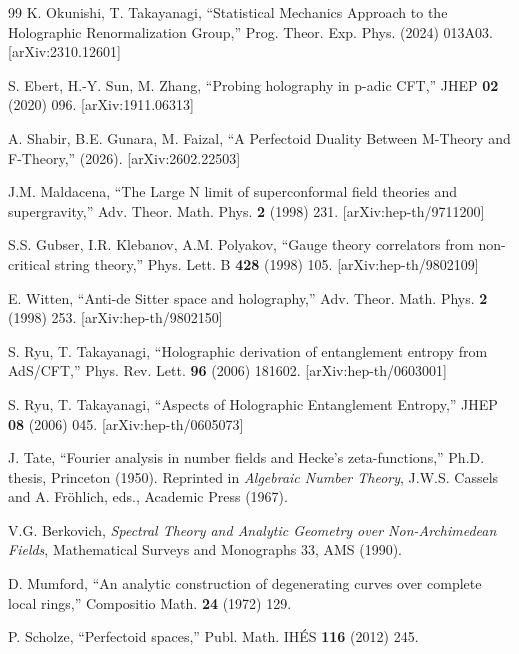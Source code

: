 \documentclass[11pt,a4paper]{ctexart}
\theoremstyle{remark}
\begin{document}
\begin{thebibliography}{99}
 K. Okunishi, T. Takayanagi, ``Statistical Mechanics Approach to the Holographic Renormalization Group,'' Prog. Theor. Exp. Phys. (2024) 013A03. [arXiv:2310.12601]

 S. Ebert, H.-Y. Sun, M. Zhang, ``Probing holography in p-adic CFT,'' JHEP \textbf{02} (2020) 096. [arXiv:1911.06313]

 A. Shabir, B.E. Gunara, M. Faizal, ``A Perfectoid Duality Between M-Theory and F-Theory,'' (2026). [arXiv:2602.22503]


 J.M. Maldacena, ``The Large N limit of superconformal field theories and supergravity,'' Adv. Theor. Math. Phys. \textbf{2} (1998) 231. [arXiv:hep-th/9711200]

 S.S. Gubser, I.R. Klebanov, A.M. Polyakov, ``Gauge theory correlators from non-critical string theory,'' Phys. Lett. B \textbf{428} (1998) 105. [arXiv:hep-th/9802109]

 E. Witten, ``Anti-de Sitter space and holography,'' Adv. Theor. Math. Phys. \textbf{2} (1998) 253. [arXiv:hep-th/9802150]

 S. Ryu, T. Takayanagi, ``Holographic derivation of entanglement entropy from AdS/CFT,'' Phys. Rev. Lett. \textbf{96} (2006) 181602. [arXiv:hep-th/0603001]

 S. Ryu, T. Takayanagi, ``Aspects of Holographic Entanglement Entropy,'' JHEP \textbf{08} (2006) 045. [arXiv:hep-th/0605073]


 J. Tate, ``Fourier analysis in number fields and Hecke's zeta-functions,'' Ph.D. thesis, Princeton (1950). Reprinted in \emph{Algebraic Number Theory}, J.W.S. Cassels and A. Fr\"ohlich, eds., Academic Press (1967).

 V.G. Berkovich, \emph{Spectral Theory and Analytic Geometry over Non-Archimedean Fields}, Mathematical Surveys and Monographs 33, AMS (1990).

 D. Mumford, ``An analytic construction of degenerating curves over complete local rings,'' Compositio Math. \textbf{24} (1972) 129.

 P. Scholze, ``Perfectoid spaces,'' Publ. Math. IH\'ES \textbf{116} (2012) 245.

\end{thebibliography}
\end{document}
